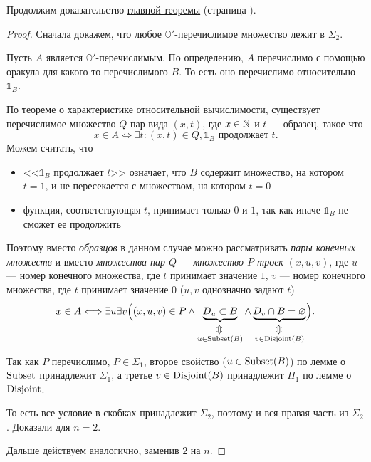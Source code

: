 \noindent
Продолжим доказательство \hyperref[thm:main_thm]{главной теоремы} (страница \pageref{thm:main_thm}).
\begin{proof}\label{proof:main_thm}
	Сначала докажем, что любое $ \mathbb{O}'$-перечислимое множество лежит в  $ \Sigma_2$.

	Пусть  $ A$ является $ \mathbb{O}'$-перечислимым. По определению, $ A$ перечислимо с помощью оракула для какого-то перечислимого $ B$. То есть оно перечислимо относительно  $ \mathbb{1}_B$.

	По теореме о характеристике относительной вычислимости, существует перечислимое множество $ Q$ пар вида $ (x, t)$,  где $ x \in \mathbb{N}$ и $ t$ --- образец, такое что 
	\[
		x \in A \Longleftrightarrow \exists t \colon (x, t) \in Q, \mathbb{1}_B \text{ продолжает } t
	.\] 
	Можем считать, что
	\begin{itemize}
		\item  <<$ \mathbb{1}_B$ продолжает $ t$>> означает, что $ B$ содержит множество, на котором  $ t = 1$, и не пересекается с множеством, на котором  $ t = 0$
		\item функция, соответствующая $ t$, принимает только $ 0$ и $ 1$, так как иначе $ \mathbb{1}_B$ не сможет ее продолжить
	\end{itemize}
	Поэтому вместо \textit{образцов} в данном случае можно рассматривать \textit{пары конечных множеств} и вместо \textit{множества пар $ Q$} --- \textit{множество $ P$ троек} $ (x, u, v)$, где $u$ --- номер конечного множества, где $t$ принимает значение $1$, $v$ --- номер конечного множества, где $t$ принимает значение $0$ ($u, v$ однозначно задают $t$)
	\[
		x \in A \Longleftrightarrow \exists u \exists v \Bigl( (x, u,v) \in P \wedge
			\underbrace{D_u \subset B}_{\stackrel{\rotatebox[origin=c]{90}{$\Leftrightarrow$}}{u \in \Subsetm(B)}} \wedge 
		\underbrace{D_v \cap B = \varnothing}_{\stackrel{\rotatebox[origin=c]{90}{$\Leftrightarrow$}}{v \in  \Disjointm(B)}} \Bigr) 
	.\] 

	Так как $ P$ перечислимо,  $ P \in \Sigma_1$, второе свойство ($u \in  \operatorname{Subset}(B)$) по лемме о $ \operatorname{Subset}$ принадлежит  $ \Sigma_1$, а третье  $ v \in \operatorname{Disjoint}(B)$ принадлежит $ \Pi_1$ по лемме о \ $ \operatorname{Disjoint}$.

	То есть все условие в скобках принадлежит  $ \Sigma_2$, поэтому и вся правая часть из  $ \Sigma_2$.  Доказали для  $ n = 2$.
	
	Дальше действуем аналогично, заменив  $ 2$ на  $ n$.
\end{proof}

